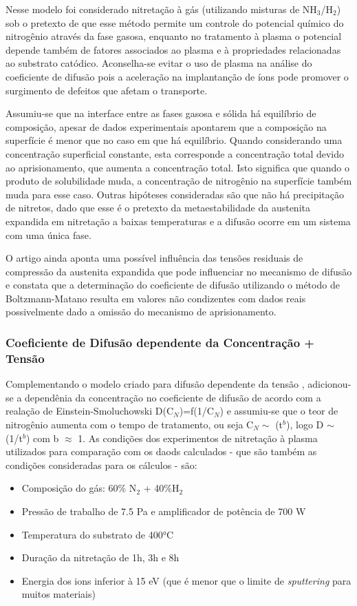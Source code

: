 \documentclass[]{politex}
\begin{document}
	Nesse modelo foi considerado nitretação à gás (utilizando misturas de NH$_3$/H$_2$) sob o pretexto de que esse método permite um controle do potencial químico do nitrogênio através da fase gasosa, enquanto no tratamento à plasma o potencial depende também de fatores associados ao plasma e à propriedades relacionadas ao substrato catódico. Aconselha-se evitar o uso de plasma na análise do coeficiente de difusão pois a aceleração na implantanção de íons pode promover o surgimento de defeitos que afetam o transporte.\par
	Assumiu-se que na interface entre as fases gasosa e sólida há equilíbrio de composição, apesar de dados experimentais apontarem que a composição na superfície é menor que no caso em que há equilíbrio. Quando considerando uma concentração superficial constante, esta corresponde a concentração total devido ao aprisionamento, que aumenta a concentração total. Isto significa que quando o produto de solubilidade muda, a concentração de nitrogênio na superfície também muda para esse caso. Outras hipóteses consideradas são que não há precipitação de nitretos, dado que esse é o pretexto da metaestabilidade da austenita expandida em nitretação a baixas temperaturas e a difusão ocorre em um sistema com uma única fase.\par
	O artigo ainda aponta uma possível influência das tensões residuais de compressão da austenita expandida que pode influenciar no mecanismo de difusão e constata que a determinação do coeficiente de difusão utilizando o método de Boltzmann-Matano resulta em valores não condizentes com dados reais possivelmente dado a omissão do mecanismo de aprisionamento.
	
\subsubsection{Coeficiente de Difusão dependente da Concentração + Tensão}
\label{sec:comb-depc-stress}
	Complementando o modelo criado para difusão dependente da tensão \cite{galdikas2010stress}, adicionou-se a dependênia da concentração no coeficiente de difusão de acordo com a realação de Einstein-Smoluchowski D(C$_N$)=f(1/C$_N$) \cite{moskalioviene2012stress} e assumiu-se que o teor de nitrogênio aumenta com o tempo de tratamento, ou seja C$_N\sim$ (t$^b$), logo D $\sim$ (1/t$^b$) com b $\approx$ 1.
	As condições dos experimentos de nitretação à plasma utilizados para comparação com os daods calculados - que são também as condições consideradas para os cálculos - são: 
	\begin{itemize}
	 \item Composição do gás: 60\% N$_2$ + 40\%H$_2$
	 \item Pressão de trabalho de 7.5 Pa e amplificador de potência de 700 W
	 \item Temperatura do substrato de 400°C
	 \item Duração da nitretação de 1h, 3h e 8h
  	 \item Energia dos ions inferior à 15 eV (que é menor que o limite de \textit{sputtering} para muitos materiais)
	\end{itemize}
	
\end{document}
